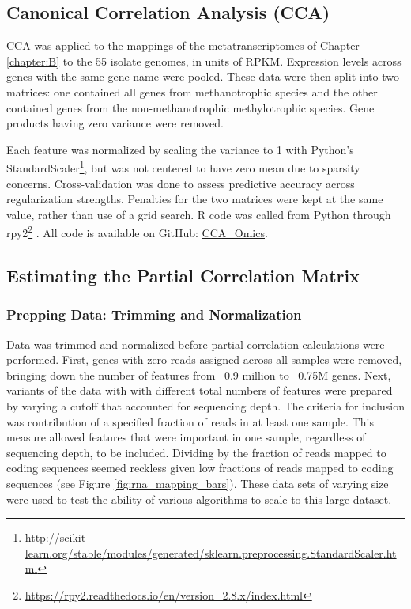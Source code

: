 \subsection{Canonical Correlation Analysis (CCA)}
CCA was applied to the mappings of the metatranscriptomes of Chapter \ref{chapter:B} to the 55 isolate genomes, in units of RPKM.
Expression levels across genes with the same gene name were pooled.
These data were then split into two matrices: one contained all genes from methanotrophic species and the other contained genes from the non-methanotrophic methylotrophic species.
Gene products having zero variance were removed.

Each feature was normalized by scaling the variance to 1 with Python's StandardScaler\footnote{\url{http://scikit-learn.org/stable/modules/generated/sklearn.preprocessing.StandardScaler.html}}, but was not centered to have zero mean due to sparsity concerns.
Cross-validation was done to assess predictive accuracy across regularization strengths.
Penalties for the two matrices were kept at the same value, rather than use of a grid search.  %
R code was called from Python through rpy2\footnote{\url{https://rpy2.readthedocs.io/en/version_2.8.x/index.html}} \cite{gautier2008}.
All code is available on GitHub: \href{https://github.com/JanetMatsen/CCA_Omics}{CCA\_Omics}.

\subsection{Estimating the Partial Correlation Matrix}

\subsubsection{Prepping Data: Trimming and Normalization}
Data was trimmed and normalized before partial correlation calculations were performed.
First, genes with zero reads assigned across all samples were removed, bringing down the number of features from ~0.9 million to ~0.75M genes. %
Next, variants of the data with with different total numbers of features were prepared by varying a cutoff that accounted for sequencing depth.
The criteria for inclusion was contribution of a specified fraction of reads in at least one sample.
This measure allowed features that were important in one sample, regardless of sequencing depth, to be included.
Dividing by the fraction of reads mapped to coding sequences seemed reckless given low fractions of reads mapped to coding sequences (see Figure \ref{fig:rna_mapping_bars}).
These data sets of varying size were used to test the ability of various algorithms to scale to this large dataset.

